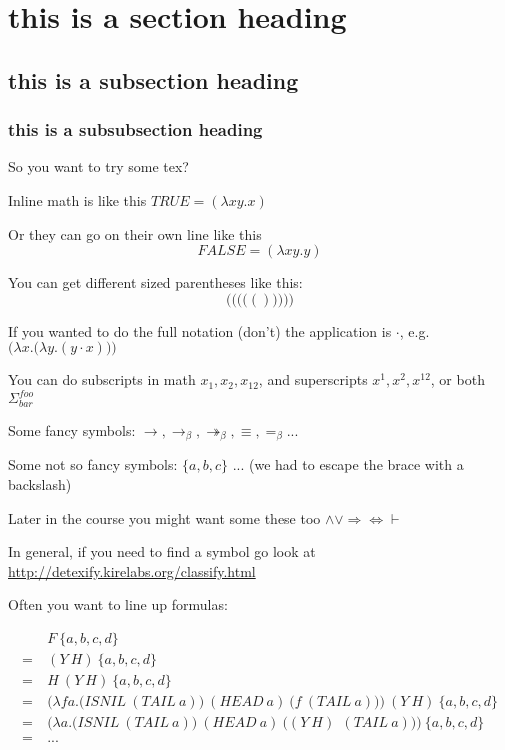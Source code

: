 \documentclass[11pt]{article}
\begin{document}
\section{this is a section heading}
\subsection{this is a subsection heading}
\subsubsection{this is a subsubsection heading}

So you want to try some tex?

Inline math is like this $TRUE = (\lambda xy.x)$

Or they can go on their own line like this $$FALSE = (\lambda xy.y)$$

You can get different sized parentheses like this:
$$ \Bigg( \bigg( \Big( \big( ( ) \big) \Big) \bigg) \Bigg) $$

If you wanted to do the full notation (don't) the application is $\cdot$, e.g. $\Big(\lambda x.\big(\lambda y.(y\cdot x)\big)\Big)$

You can do subscripts in math $x_1, x_2, x_{12}$, and superscripts $x^1, x^2, x^{12}$, or both $\Sigma_{bar}^{foo}$

Some fancy symbols: $\rightarrow, \rightarrow_\beta, \twoheadrightarrow_\beta, \equiv, =_\beta...$

Some not so fancy symbols: $\{a, b, c\}$ ... (we had to escape the brace with a backslash)

Later in the course you might want some these too $\land \lor \Rightarrow \Leftrightarrow \vdash$

In general, if you need to find a symbol go look at \url{http://detexify.kirelabs.org/classify.html}

Often you want to line up formulas:

\begin{align*}
  & F\ \{a,b,c,d\} \\
  =\ & (Y\ H)\ \{a,b,c,d\} \\
  =\ & H\ (Y\ H)\ \{a,b,c,d\} \tag{Y Combinator} \\
  =\ & \Big(\lambda fa.\big(ISNIL\ (TAIL\ a)\big)\ (HEAD\ a)\ \big(f\ (TAIL\ a)\big)\Big)\ (Y\ H)\ \{a,b,c,d\}   \\
  =\ & \Big(\lambda a.\big(ISNIL\ (TAIL\ a)\big)\ (HEAD\ a)\ \big((Y\ H)\ \ (TAIL\ a)\big)\Big)\ \{a,b,c,d\}    \tag{$\beta$-reduction}\\
  =\ & ...
\end{align*}
\end{document}
